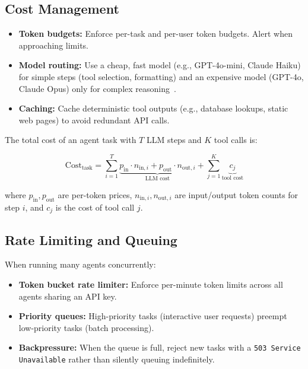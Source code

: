 \subsection{Cost Management}
\label{cost-management}

\begin{itemize}
  \item \textbf{Token budgets:} Enforce per-task and per-user token budgets. Alert when approaching limits.
  \item \textbf{Model routing:} Use a cheap, fast model (e.g., GPT-4o-mini, Claude Haiku) for simple steps (tool selection, formatting) and an expensive model (GPT-4o, Claude Opus) only for complex reasoning~\cite{chen2023frugalgpt}.
  \item \textbf{Caching:} Cache deterministic tool outputs (e.g., database lookups, static web pages) to avoid redundant API calls.
\end{itemize}

The total cost of an agent task with $T$ LLM steps and $K$ tool calls is:

\begin{equation}
\text{Cost}_{\text{task}} = \sum_{i=1}^{T} \underbrace{p_{\text{in}} \cdot n_{\text{in},i} + p_{\text{out}} \cdot n_{\text{out},i}}_{\text{LLM cost}} + \sum_{j=1}^{K} \underbrace{c_j}_{\text{tool cost}}
\end{equation}

where $p_{\text{in}}, p_{\text{out}}$ are per-token prices, $n_{\text{in},i}, n_{\text{out},i}$ are input/output token counts for step $i$, and $c_j$ is the cost of tool call $j$.

\subsection{Rate Limiting and Queuing}
\label{rate-limiting-and-queuing}

When running many agents concurrently:

\begin{itemize}
  \item \textbf{Token bucket rate limiter:} Enforce per-minute token limits across all agents sharing an API key.
  \item \textbf{Priority queues:} High-priority tasks (interactive user requests) preempt low-priority tasks (batch processing).
  \item \textbf{Backpressure:} When the queue is full, reject new tasks with a \texttt{503 Service Unavailable} rather than silently queuing indefinitely.
\end{itemize}

